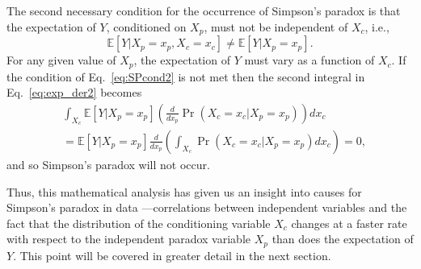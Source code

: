 The second necessary condition for the occurrence of Simpson's paradox is that the expectation of $Y$, conditioned on $X_p$, must not be independent of $X_c$, i.e.,
\begin{equation}
	\mathbb{E}[Y|X_p = x_p, X_c = x_c] \neq \mathbb{E}[Y|X_p = x_p].
        \label{eq:SPcond2}
\end{equation}
For any given value of $X_p$, the expectation of $Y$ must vary as a function of $X_c$. If the condition of Eq.~\eqref{eq:SPcond2} is not met then the second integral in Eq.~\eqref{eq:exp_der2} becomes
\begin{align}
\label{eq:SP_cond2b}
	&\int_{X_c}\mathbb{E}[Y|X_p = x_p]\left(\frac{d}{dx_p}\Pr(X_c=x_c|X_p=x_p)\right)dx_c \\ \nonumber
	&= \mathbb{E}[Y|X_p = x_p]\frac{d}{dx_p}\left(\int_{X_c}\Pr(X_c=x_c|X_p=x_p)dx_c\right) = 0,
\end{align}
and so Simpson's paradox will not occur. %

Thus, this mathematical analysis has given us an insight into causes for Simpson's paradox in data ---correlations between independent variables and the fact that the distribution of the conditioning variable $X_c$ changes at a faster rate with respect to the independent paradox variable $X_p$ than does the expectation of $Y$. This point will be covered in greater detail in the next section.

